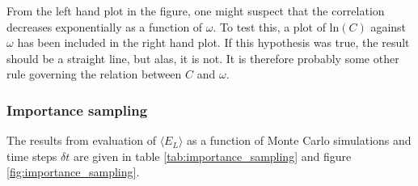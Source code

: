 From the left hand plot in the figure, one might suspect that the correlation decreases exponentially as a function of $\omega$. 
To test this, a plot of $\textrm{ln}(C)$ against $\omega$ has been included in the right hand plot. 
If this hypothesis was true, the result should be a straight line, but alas, it is not. 
It is therefore probably some other rule governing the relation between $C$ and $\omega$. 





\subsubsection{Importance sampling} \label{sec:res_importance_sampling}

The results from evaluation of $\langle E_L \rangle$ as a function of Monte Carlo simulations and time steps $\delta t$ are given in table \ref{tab:importance_sampling} and figure \ref{fig:importance_sampling}.

